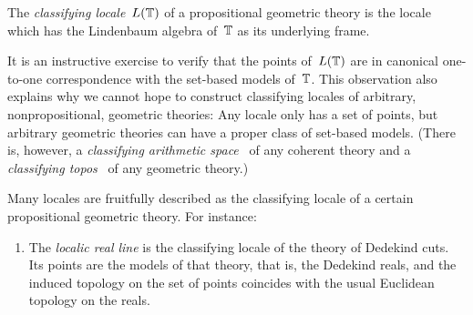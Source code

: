 \documentclass{ws-rv9x6}
\begin{document}
{\begin{definition}The \emph{classifying locale}~$L(\mathbb{T})$ of a propositional
geometric theory is the locale which has the Lindenbaum algebra of~$\mathbb{T}$ as its
underlying frame.\end{definition}

It is an instructive exercise to verify that the points of~$L(\mathbb{T})$ are in
canonical one-to-one correspondence with the set-based models of~$\mathbb{T}$. This
observation also explains why we cannot hope to construct classifying
locales of arbitrary, nonpropositional, geometric theories: Any locale only has
a set of points, but arbitrary geometric theories can have a proper class of
set-based models. (There is, however, a \emph{classifying arithmetic
space}~\cite{vickers:sketches} of any coherent theory and a \emph{classifying
topos}~\cite[Section~2]{caramello:tst} of any geometric theory.)

Many locales are fruitfully described as the classifying locale of a certain
propositional geometric theory. For instance:
\begin{enumerate}
\item The \emph{localic real line} is the classifying locale of the theory of
Dedekind cuts. Its points are the models of that theory, that is, the Dedekind
reals, and the induced topology on the set of points coincides with the usual
Euclidean topology on the reals.


\end{enumerate}}
\end{document}
